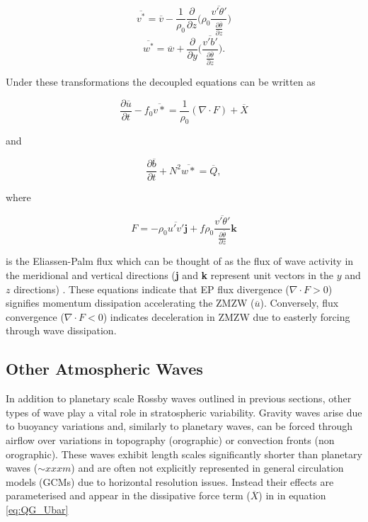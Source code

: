 \begin{equation} \label{eq:V*}
\overline{v^*} = \overline{v} - \frac{1}{\rho_0}\frac{\partial}{\partial z} \bigg(\rho_0 \frac{\overline{v'\theta'}}{\frac{\partial{\overline{\theta}}}{\partial{z}}}\bigg)
\end{equation}\break
\begin{equation} \label{eq:W*}
\overline{w^*} = \overline{w} + \frac{\partial}{\partial y} \bigg( \frac{\overline{v'b'}}{\frac{\partial{\overline{\theta}}}{\partial{z}}}\bigg).
\end{equation}

Under these transformations the decoupled equations can be written as

\begin{equation} \label{eq:decoupled_U}
\frac{\partial \overline{u}}{\partial t} - f_0 \overline{v*} = \frac{1}{\rho_0} (\nabla \cdot F) + \overline{X}
\end{equation}

and

\begin{equation} \label{eq:decoupled_b}
\frac{\partial \overline{b}}{\partial t} + N^2 \overline{w*} = \overline{Q},
\end{equation}

where

\begin{equation} \label{eq:EP_flux}
F = -\rho_0 \overline{u'v'}\textbf{j} + f\rho_0\frac{\overline{v'\theta'}}{\frac{\partial{\overline{\theta}}}{\partial{z}}} \textbf{k}
\end{equation}

\noindent is the Eliassen-Palm flux which can be thought of as the flux of wave activity in the meridional and vertical directions (\textbf{j} and \textbf{k} represent unit vectors in the $y$ and $z$ directions) \citep{andrewsPlanetary1976}. These equations indicate that EP flux divergence ($\nabla \cdot F > 0$) signifies momentum dissipation accelerating the ZMZW ($\overline{u}$). Conversely, flux convergence ($\nabla \cdot F < 0$) indicates deceleration in ZMZW due to easterly forcing through wave dissipation.

\subsection{Other Atmospheric Waves} \label{sec:other_waves}
In addition to planetary scale Rossby waves outlined in previous sections, other types of wave play a vital role in stratospheric variability. Gravity waves arise due to buoyancy variations and, similarly to planetary waves, can be forced through airflow over variations in topography (orographic) or convection fronts (non orographic). These waves exhibit length scales significantly shorter than planetary waves ($\sim xxxm$) and are often not explicitly represented in general circulation models (GCMs) due to horizontal resolution issues. Instead their effects are parameterised and appear in the dissipative force term ($\overline{X}$) in in equation \ref{eq:QG_Ubar}

